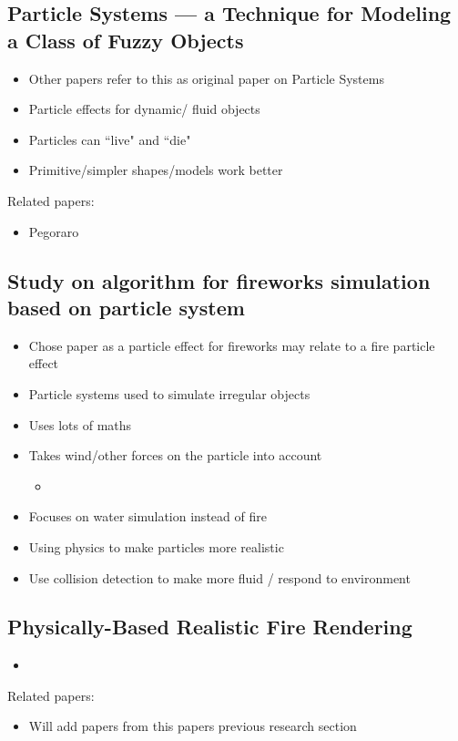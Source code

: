 \documentclass{scrartcl}
\begin{document}
\subsection{ Particle Systems --- a Technique for Modeling a Class of Fuzzy Objects \cite{Reeves}}
\begin{itemize}
	\item Other papers refer to this as original paper on Particle Systems
	\item Particle effects for dynamic/ fluid objects 
	\item Particles can ``live" and ``die"
	\item Primitive/simpler shapes/models work better
\end{itemize}
Related papers: \begin{itemize}
	\item Pegoraro \cite{Pegoraro}
\end{itemize}

\subsection{Study on algorithm for fireworks simulation based on particle system \cite{Lei}}
\begin{itemize}
	\item Chose paper as a particle effect for fireworks may relate to a fire particle effect
	\item Particle systems used to simulate irregular objects 
	\item Uses lots of maths
	\item Takes wind/other forces on the particle into account
	\begin{itemize}
		\item 
	\end{itemize}
\end{itemize}

\begin{itemize}
	\item Focuses on water simulation instead of fire
	\item Using physics to make particles more realistic 
	\item Use collision detection to make more fluid / respond to environment 	
\end{itemize}

\subsection{Physically-Based Realistic Fire Rendering \cite{Pegoraro}}
\begin{itemize}
	\item 
\end{itemize}
Related papers: \begin{itemize}
	\item Will add papers from this papers previous research section
\end{itemize}

	


	
\end{document}
